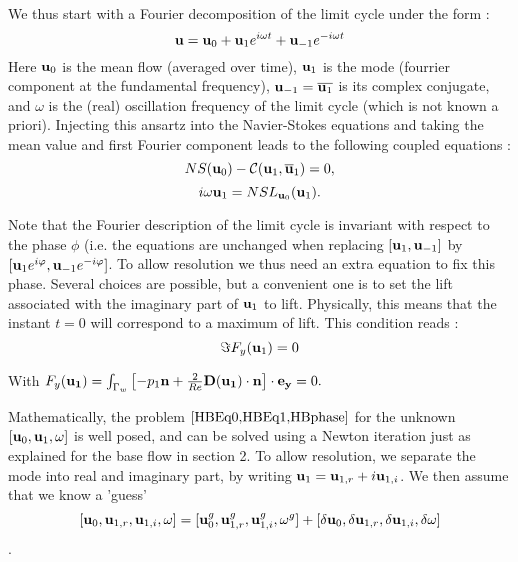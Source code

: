 \documentclass[twocolumn,10pt]{asme2ej}
\newcommand{\be}[1]{ \begin{equation} \label{#1}}
\newcommand{\ee}{\end{equation}}
\begin{document}
We thus start with a Fourier decomposition of the limit cycle under the form :
\be{HB}
{\bf u } = {\bf u }_0 + {\bf u }_1 e^{i \omega t} +   {\bf u }_{-1} e^{-i \omega t}
\ee  
Here ${\bf u }_0$ is the mean flow (averaged over time),  ${\bf u }_1$ is the mode
(fourrier component at the fundamental frequency), ${\bf u }_{-1} = \overline{{\bf u }_1}$ is its complex conjugate, and $\omega$ is the (real) oscillation frequency of the limit cycle (which is not known a priori). Injecting this ansartz into the Navier-Stokes equations and taking the mean value and first Fourier component leads to the following coupled equations :
\be{HBEq0}
NS(  {\bf u }_0 ) - {\cal C}( {\bf u }_1, \overline{\bf u }_1) = 0,
\ee
\be{HBEq1}
i \omega {\bf u }_1 =  NSL_{{\bf u }_0}(  {\bf u }_1 ).
\ee

Note that the Fourier description of the limit cycle is invariant with respect to the phase $\phi$ (i.e. the equations are unchanged when replacing $[ {\bf u }_1,  {\bf u }_{-1}] $ by  $[ {\bf u }_1 e^{i\varphi},  {\bf u }_{-1}  e^{-i\varphi}] $. 
To allow resolution we thus need an extra equation to fix this phase. Several choices are possible, but a convenient one is to set the lift associated with the imaginary part of ${\bf u }_1$ to lift. Physically, this means that the instant $t=0$ will correspond to a maximum of lift. This condition reads :
\be{HBphase}
\Im F_y({\bf u}_1) =0
\ee

With $F_y ({\bf u_1}) = 
 \int_{\Gamma_w} \left[-p_1 {\bf n} + \frac{2}{Re} {\bf D}({\bf u_1}) \cdot {\bf n} \right]   \cdot {\bf e_y}  = 0.$


Mathematically, the problem $\ref{HBEq0,HBEq1,HBphase}$ for the unknown $[{\bf u }_0, {\bf u }_{1}, \omega]$ is well posed, and can be solved using a Newton iteration just as explained for the base flow in section 2. To allow resolution, we separate the mode into real and imaginary part, by writing ${\bf u }_1 = {\bf u }_{1,r} +  i {\bf u }_{1,i} $.
We then assume that we know a 'guess' 
$$
[{\bf u }_0, {\bf u }_{1,r}, {\bf u }_{1,i}, \omega] = 
 [{\bf u }_0^g, {\bf u }_{1,r}^g, {\bf u }_{1,i}^g, \omega^g]
+ [\delta {\bf u }_0, \delta {\bf u }_{1,r}, \delta {\bf u }_{1,i}, \delta \omega]
$$.
\end{document}

